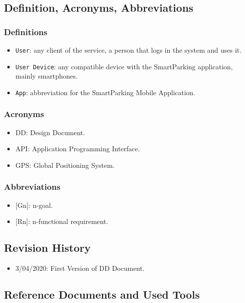 \documentclass[11pt]{article} %
\begin{document}
\subsection{Definition, Acronyms, Abbreviations}

\subsubsection{Definitions}
\begin{itemize}
\item \texttt{User}: any client of the service, a person that logs in the system and uses it.
\item \texttt{User Device}: any compatible device with the SmartParking application, mainly smartphones.
\item \texttt{App}: abbreviation for the SmartParking Mobile Application.
\end{itemize}

\subsubsection{Acronyms}
\begin{itemize}
\item DD: Design Document.
\item API: Application Programming Interface.
\item GPS: Global Positioning System.
\end{itemize}

\subsubsection{Abbreviations}
\begin{itemize}
\item {}[Gn]: n-goal.
\item {}[Rn]: n-functional requirement.
\end{itemize}

\subsection{Revision History}
\begin{itemize}
\item 3/04/2020: First Version of DD Document.
\end{itemize}

\subsection{Reference Documents and Used Tools}
\end{document}
